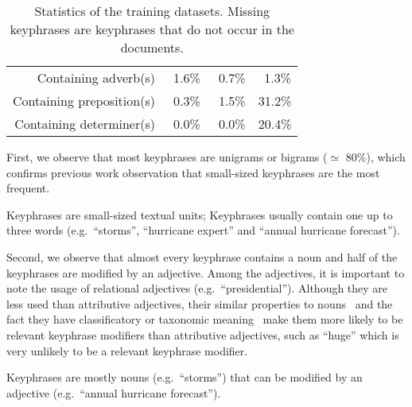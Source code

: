 \begin{table}
\begin{tabular}{lr|ccc}
        \multicolumn{2}{r|}{Containing adverb(s)} & $~~$1.6\% & $~~$0.7\% & $~~$1.3\%\\
        \multicolumn{2}{r|}{Containing preposition(s)} & $~~$0.3\% & $~~$1.5\% & 31.2\%\\
        \multicolumn{2}{r|}{Containing determiner(s)} & $~~$0.0\% & $~~$0.0\% & 20.4\%\\
        \bottomrule
      \end{tabular}
      \caption{Statistics of the training datasets. Missing keyphrases are
               keyphrases that do not occur in the documents.
               \label{tab:train_dataset_statistics}}
    \end{table}

    First, we observe that most keyphrases are unigrams or bigrams
    ($\simeq$ 80\%), which confirms previous work observation that small-sized
    keyphrases are the most frequent.
    
    \begin{property}\label{prop:informativity}
      Keyphrases are small-sized textual units; Keyphrases usually contain one
      up to three words (e.g.~``storms'', ``hurricane expert'' and ``annual
      hurricane forecast'').
    \end{property}

    Second, we observe that almost every keyphrase contains a noun and half of
    the keyphrases are modified by an adjective. Among the adjectives, it is
    important to note the usage of relational adjectives
    (e.g.~``presidential''). Although they are less used than attributive
    adjectives, their similar properties to
    nouns~\cite{bally1944linguistiquegeneraleetlinguistiquefrancaise} and the
    fact they have classificatory or taxonomic
    meaning~\cite{mcnally2004relationaladjectives} make them more likely to be
    relevant keyphrase modifiers than attributive adjectives, such as ``huge''
    which is very unlikely to be a relevant keyphrase modifier.

    \begin{property}\label{prop:noun_phrases}
      Keyphrases are mostly nouns (e.g.~``storms'') that can be modified by an
      adjective (e.g.~``annual hurricane forecast'').
    \end{property}

